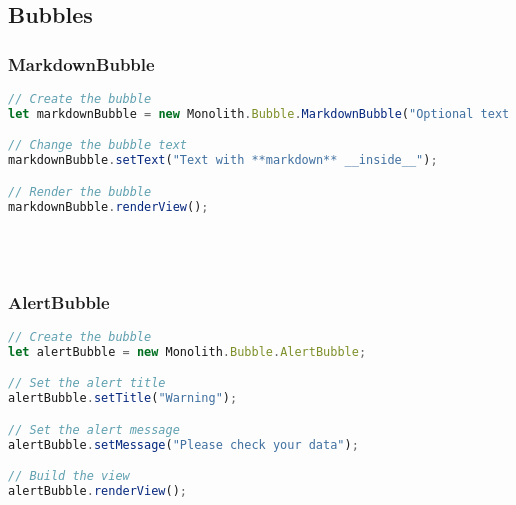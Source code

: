 \subsection{Bubbles}
\subsubsection{MarkdownBubble}
\begin{lstlisting}[language=JavaScript]
// Create the bubble
let markdownBubble = new Monolith.Bubble.MarkdownBubble("Optional text here");

// Change the bubble text
markdownBubble.setText("Text with **markdown** __inside__");

// Render the bubble
markdownBubble.renderView();
\end{lstlisting}
~\\~\\

\subsubsection{AlertBubble}
\begin{lstlisting}[language=JavaScript]
// Create the bubble
let alertBubble = new Monolith.Bubble.AlertBubble;

// Set the alert title
alertBubble.setTitle("Warning");

// Set the alert message
alertBubble.setMessage("Please check your data");

// Build the view
alertBubble.renderView();
\end{lstlisting}

\newpage
